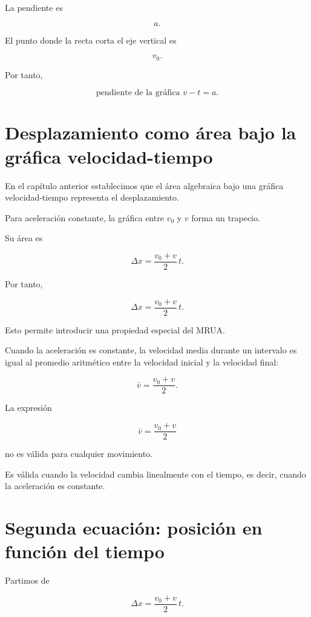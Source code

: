 La pendiente es

\[ a. \]

El punto donde la recta corta el eje vertical es

\[ v_0. \]

Por tanto,

\[
\boxed{
\text{pendiente de la gráfica }v-t=a
}.
\]


\section{Desplazamiento como área bajo la gráfica velocidad-tiempo}

En el capítulo anterior establecimos que el área algebraica bajo una gráfica
velocidad-tiempo representa el desplazamiento.

Para aceleración constante, la gráfica entre \(v_0\) y \(v\) forma un
trapecio.

Su área es

\[
\Delta x
=
\frac{v_0+v}{2}\,t.
\]

Por tanto,

\[ \boxed{\Delta x=\frac{v_0+v}{2}\,t}. \]

Esto permite introducir una propiedad especial del MRUA.

\begin{definicion}
Cuando la aceleración es constante, la velocidad media durante un intervalo
es igual al promedio aritmético entre la velocidad inicial y la velocidad
final:
\end{definicion}

\[ \boxed{\bar{v}=\frac{v_0+v}{2}}. \]

\begin{advertencia}
La expresión

\[ \bar{v}=\frac{v_0+v}{2} \]

no es válida para cualquier movimiento.

Es válida cuando la velocidad cambia linealmente con el tiempo, es decir,
cuando la aceleración es constante.
\end{advertencia}


\section{Segunda ecuación: posición en función del tiempo}

Partimos de

\[ \Delta x=\frac{v_0+v}{2}\,t. \]

